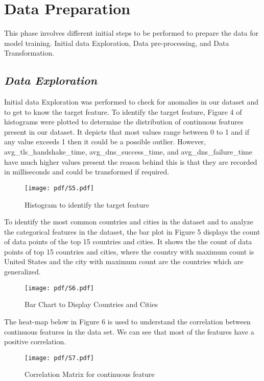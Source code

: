 \section{Data Preparation}
This phase involves different initial steps to be performed to prepare the data for model training. Initial data Exploration, Data pre-processing, and Data Transformation.

\subsection {\textit{Data Exploration}}
Initial data Exploration was performed to check for anomalies in our dataset and to get to know the target feature. To identify the target feature, Figure 4 of histograms were plotted to determine the distribution of continuous features present in our dataset. It depicts that most values range between 0 to 1 and if any value exceeds 1 then it could be a possible outlier. However, avg\_tls\_handshake\_time, avg\_dns\_success\_time, and avg\_dns\_failure\_time have much higher values present the reason behind this is that they are recorded in milliseconds and could be transformed if required.
\begin{figure}[ht!]
  \raggedright
  \texttt{[image: pdf/S5.pdf]}
  \vspace{-60pt}
  \caption{Histogram to identify the target feature}
\end{figure}

To identify the most common countries and cities in the dataset and to analyze the categorical features in the dataset, the bar plot in Figure 5 displays the count of data points of the top 15 countries and cities. It shows the the count of data points of top 15 countries and cities, where the country with maximum count is United States and the city with maximum count are the countries which are generalized.
  \begin{figure}[ht!]
  \raggedright
  \texttt{[image: pdf/S6.pdf]}
  \vspace{-45pt}
  \caption{Bar Chart to Display Countries and Cities}
\end{figure}

The heat-map below in Figure 6 is used to understand the correlation between continuous features in the data set. We can see that most of the features have a positive correlation.
\begin{figure}[ht!]
  \raggedright
  \texttt{[image: pdf/S7.pdf]}
  \vspace{-10pt}
  \caption{Correlation Matrix for continuous feature}
\end{figure}


